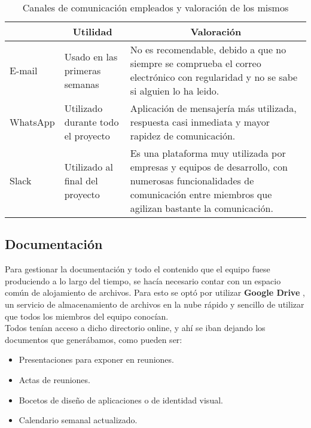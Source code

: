 \begin{table}
    \begin{center}
        \begin{tabular}{|l|p{3cm}|p{5cm}|}
            \hline
                \rowcolor{Gray}\multicolumn{1}{|c|}{\textbf{Canal}}
                & \multicolumn{1}{|c|}{\textbf{Utilidad}} & \multicolumn{1}{|c|}{\textbf{Valoración}} \\
            \hline
                E-mail & Usado en las primeras semanas & No es recomendable, debido a que no siempre se comprueba el correo electrónico con regularidad y no se sabe si alguien lo ha leido. \\
            \hline
                WhatsApp \cite{whatsapp} & Utilizado durante todo el proyecto & Aplicación de mensajería más utilizada, respuesta casi inmediata y mayor rapidez de comunicación. \\
            \hline
                Slack \cite{slack} & Utilizado al final del proyecto & Es una plataforma muy utilizada por empresas y equipos de desarrollo, con numerosas funcionalidades de comunicación entre miembros que agilizan bastante la comunicación. \\
            \hline
        \end{tabular}

        \caption{Canales de comunicación empleados y valoración de los mismos}
        \label{canalescomunicacion}
    \end{center}
\end{table}

\subsection{Documentación}
Para gestionar la documentación y todo el contenido que el equipo fuese produciendo a lo largo del tiempo, se hacía necesario contar con un espacio común de alojamiento de archivos. Para esto se optó por utilizar \textbf{Google Drive} \cite{googledrive}, un servicio de almacenamiento de archivos en la nube rápido y sencillo de utilizar que todos los miembros del equipo conocían.\\

Todos tenían acceso a dicho directorio online, y ahí se iban dejando los documentos que generábamos, como pueden ser:
\begin{itemize}
    \item Presentaciones para exponer en reuniones.
    \item Actas de reuniones.
    \item Bocetos de diseño de aplicaciones o de identidad visual.
    \item Calendario semanal actualizado.
\end{itemize}

